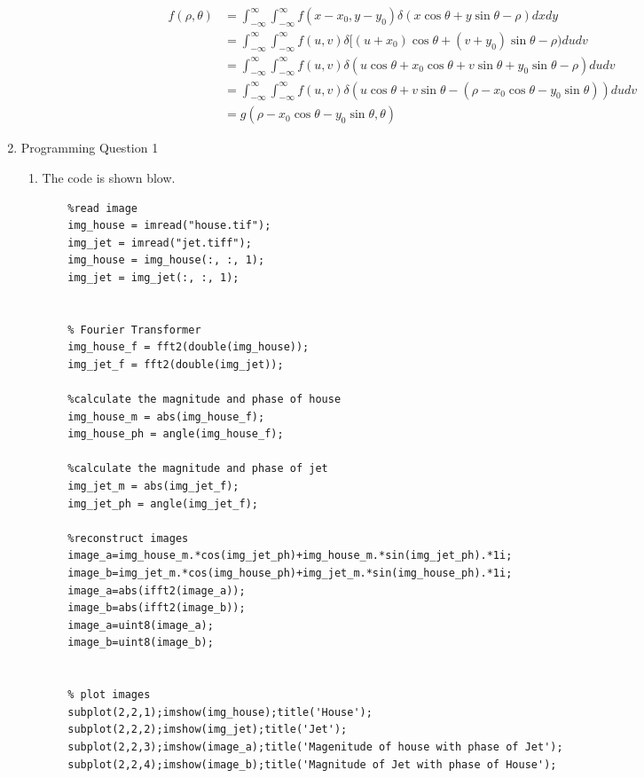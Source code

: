 \documentclass[12pt]{article}
\begin{document}
\begin{enumerate}[leftmargin=\labelsep]
\begin{enumerate}
    \begin{equation}
        \begin{aligned}
                f(\rho, \theta)
                &= \int_{-\infty}^{\infty}\int_{-\infty}^{\infty}f(x - x_0, y - y_0) \delta(x\cos\theta + y\sin\theta - \rho)dxdy\\
                &= \int_{-\infty}^{\infty}\int_{-\infty}^{\infty}f(u, v)\delta[(u + x_0)\cos\theta + (v + y_0)\sin\theta - \rho)dudv\\
                &= \int_{-\infty}^{\infty}\int_{-\infty}^{\infty}f(u, v)\delta(u\cos\theta + x_0\cos\theta + v\sin\theta + y_0\sin\theta - \rho)dudv\\
                &= \int_{-\infty}^{\infty}\int_{-\infty}^{\infty}f(u, v)\delta(u\cos\theta + v\sin\theta - (\rho - x_0\cos\theta - y_0\sin\theta))dudv\\
                &= g(\rho - x_0\cos\theta - y_0\sin\theta, \theta)
        \end{aligned}
    \end{equation}    

\end{enumerate}

\item Programming Question 1 
\begin{enumerate}
\item The code is shown blow.
\begin{lstlisting}
    %read image
    img_house = imread("house.tif");
    img_jet = imread("jet.tiff");
    img_house = img_house(:, :, 1);
    img_jet = img_jet(:, :, 1);
    
    
    % Fourier Transformer
    img_house_f = fft2(double(img_house));
    img_jet_f = fft2(double(img_jet));
    
    %calculate the magnitude and phase of house
    img_house_m = abs(img_house_f);
    img_house_ph = angle(img_house_f);
    
    %calculate the magnitude and phase of jet
    img_jet_m = abs(img_jet_f);
    img_jet_ph = angle(img_jet_f); 
    
    %reconstruct images
    image_a=img_house_m.*cos(img_jet_ph)+img_house_m.*sin(img_jet_ph).*1i;
    image_b=img_jet_m.*cos(img_house_ph)+img_jet_m.*sin(img_house_ph).*1i;
    image_a=abs(ifft2(image_a));
    image_b=abs(ifft2(image_b));
    image_a=uint8(image_a);
    image_b=uint8(image_b);
    
    
    % plot images
    subplot(2,2,1);imshow(img_house);title('House');
    subplot(2,2,2);imshow(img_jet);title('Jet');
    subplot(2,2,3);imshow(image_a);title('Magenitude of house with phase of Jet');
    subplot(2,2,4);imshow(image_b);title('Magnitude of Jet with phase of House');
\end{lstlisting}


\end{enumerate}
\end{enumerate}
\end{document}
